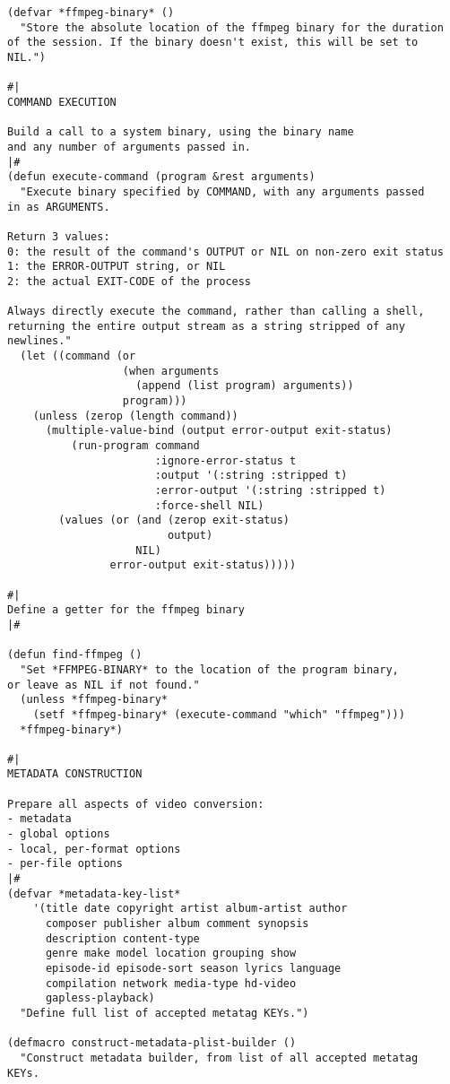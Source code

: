 \documentclass{article}
\begin{document}
\begin{verbatim}
(defvar *ffmpeg-binary* ()
  "Store the absolute location of the ffmpeg binary for the duration of the session. If the binary doesn't exist, this will be set to NIL.")

#|
COMMAND EXECUTION

Build a call to a system binary, using the binary name
and any number of arguments passed in.
|#
(defun execute-command (program &rest arguments)
  "Execute binary specified by COMMAND, with any arguments passed
in as ARGUMENTS.

Return 3 values:
0: the result of the command's OUTPUT or NIL on non-zero exit status
1: the ERROR-OUTPUT string, or NIL
2: the actual EXIT-CODE of the process

Always directly execute the command, rather than calling a shell,
returning the entire output stream as a string stripped of any
newlines."
  (let ((command (or
                  (when arguments
                    (append (list program) arguments))
                  program)))
    (unless (zerop (length command))
      (multiple-value-bind (output error-output exit-status)
          (run-program command
                       :ignore-error-status t
                       :output '(:string :stripped t)
                       :error-output '(:string :stripped t)
                       :force-shell NIL)
        (values (or (and (zerop exit-status)
                         output)
                    NIL)
                error-output exit-status)))))

#|
Define a getter for the ffmpeg binary
|#

(defun find-ffmpeg ()
  "Set *FFMPEG-BINARY* to the location of the program binary,
or leave as NIL if not found."
  (unless *ffmpeg-binary*
    (setf *ffmpeg-binary* (execute-command "which" "ffmpeg")))
  *ffmpeg-binary*)

#|
METADATA CONSTRUCTION

Prepare all aspects of video conversion:
- metadata
- global options
- local, per-format options
- per-file options
|#
(defvar *metadata-key-list*
    '(title date copyright artist album-artist author
      composer publisher album comment synopsis
      description content-type
      genre make model location grouping show
      episode-id episode-sort season lyrics language
      compilation network media-type hd-video
      gapless-playback)
  "Define full list of accepted metatag KEYs.")

(defmacro construct-metadata-plist-builder ()
  "Construct metadata builder, from list of all accepted metatag
KEYs.


\end{verbatim}
\end{document}

